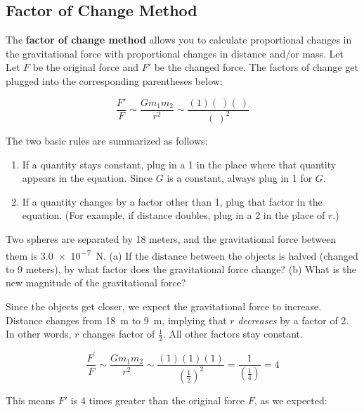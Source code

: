 \documentclass[dvipsnames]{article}
\numberwithin{equation}{section}
\numberwithin{figure}{section}
\begin{document}
\subsection{Factor of Change Method}

The \textbf{factor of change method} allows you to calculate proportional changes in the gravitational force with proportional changes in distance and/or mass. Let Let $F$ be the original force and $F'$ be the changed force. The factors of change get plugged into the corresponding parentheses below:

\begin{equation*}
    \frac{F'}{F} \sim \frac{G m_1 m_2}{r^2} \sim \frac{(1)(\ )(\ )}{(\ )^2}
\end{equation*}

The two basic rules are summarized as follows:

\begin{enumerate}
\setlength\itemsep{0ex}
    \item If a quantity stays constant, plug in a 1 in the place where that quantity appears in the equation. Since $G$ is a constant, always plug in 1 for $G$.
    \item If a quantity changes by a factor other than 1, plug that factor in the equation. (For example, if distance doubles, plug in a 2 in the place of $r$.)
\end{enumerate}



\begin{example} \label{ex5bd1}
Two spheres are separated by 18 meters, and the gravitational force between them is \SI{3.0e-7}{N}. (a) If the distance between the objects is halved (changed to 9 meters), by what factor does the gravitational force change? (b) What is the new magnitude of the gravitational force?
\end{example}

\Solution Since the objects get closer, we expect the gravitational force to increase. Distance changes from \SI{18}{m} to \SI{9}{m}, implying that $r$ \textit{decreases} by a factor of 2. In other words, $r$ changes factor of $\frac{1}{2}$. All other factors stay constant. 

\begin{equation*}
    \frac{F^{\prime}}{F} \sim \frac{G m_1 m_2}{r^2} \sim \frac{(1)(1)(1)}{\left(\frac{1}{2}\right)^2} = \frac{1}{\left(\frac{1}{4}\right)} = 4
\end{equation*}

This means $F'$ is 4 times greater than the original force $F$, as we expected:
\end{document}
